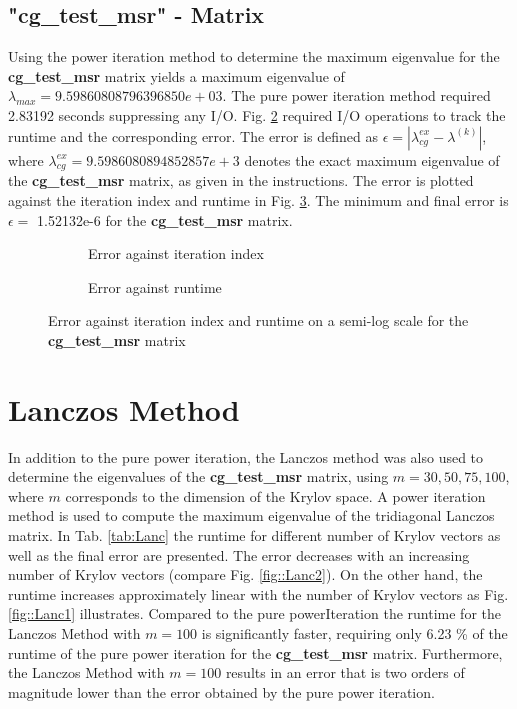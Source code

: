 \documentclass[11pt,a4paper]{article}
\newcommand{\refFig}[1]{Fig. \ref{#1}}
\newcommand{\refTab}[1]{Tab. \ref{#1}}
\begin{document}
\subsection{"{cg\_test\_msr}" - Matrix}
Using the power iteration method to determine the maximum eigenvalue for the \textbf{cg\_test\_msr} matrix yields a maximum eigenvalue of $\lambda_{max} = 9.59860808796396850e+03$. The pure power iteration method required 2.83192 seconds suppressing any I/O. \refFig{fig::Power2} required I/O operations to track the runtime and the corresponding error. The error is defined as $\epsilon = |\lambda_{cg}^{ex} - \lambda^{(k)}|$, where $\lambda_{cg}^{ex} = 9.5986080894852857e+3$ denotes the exact maximum eigenvalue of the \textbf{cg\_test\_msr} matrix, as given in the instructions. The error is plotted against the iteration index and runtime in \refFig{fig::PowerIt}. The minimum and final error is $\epsilon =$ 1.52132e-6 for the \textbf{cg\_test\_msr} matrix.

\begin{figure}[h!]
	\centering
	\begin{subfigure}[h!]{.49\textwidth}
		\begin{center}
			\resizebox{0.52\width}{!}{}
			\caption{Error against iteration index}
			\label{fig::Power1}
		\end{center}	
	\end{subfigure}
	\hfill
	\begin{subfigure}[h!]{.49\textwidth}
		\centering
		\resizebox{0.52\width}{!}{}
		\caption{Error against runtime}
		\label{fig::Power2}
	\end{subfigure}
	\caption{Error against iteration index and runtime on a semi-log scale for the \textbf{cg\_test\_msr} matrix}
	\label{fig::PowerIt}
\end{figure}
	
\section{Lanczos Method}
In addition to the pure power iteration, the Lanczos method was also used to determine the eigenvalues of the \textbf{cg\_test\_msr} matrix, using $m = 30,50,75,100$, where $m$ corresponds to the dimension of the Krylov space. A power iteration method is used to compute the  maximum eigenvalue of the tridiagonal Lanczos matrix. In \refTab{tab:Lanc} the runtime for different number of Krylov vectors as well as the final error are presented. The error decreases with an increasing number of Krylov vectors (compare \refFig{fig::Lanc2}). On the other hand, the runtime increases approximately linear with the number of Krylov vectors as \refFig{fig::Lanc1} illustrates. 
Compared to the pure powerIteration the runtime for the Lanczos Method with $m=100$ is significantly faster, requiring only 6.23 \% of the runtime of the pure power iteration for the \textbf{cg\_test\_msr} matrix. Furthermore, the Lanczos Method with $m=100$ results in an error that is two orders of magnitude lower than the error obtained by the pure power iteration.
\end{document}
